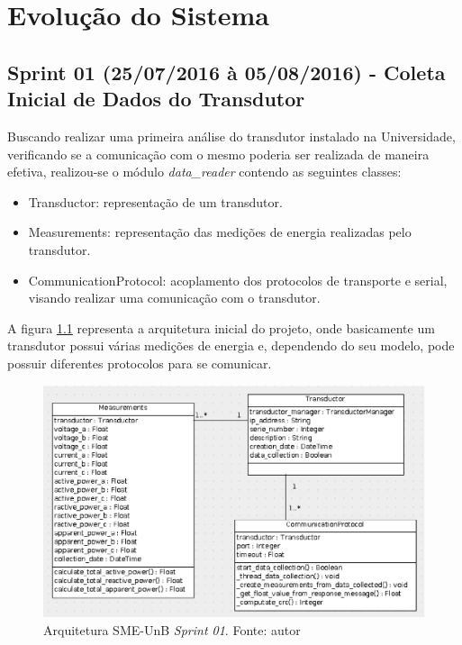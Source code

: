 \chapter{Evolução do Sistema}

\section{Sprint 01 (25/07/2016 à 05/08/2016) - Coleta Inicial de Dados do Transdutor}
Buscando realizar uma primeira análise do transdutor instalado na Universidade, verificando se a comunicação com o mesmo poderia ser realizada de maneira efetiva, realizou-se o módulo \textit{data\_reader} contendo as seguintes classes:
\begin{itemize}
    \item Transductor: representação de um transdutor.
    \item Measurements: representação das medições de energia realizadas pelo transdutor.
    \item CommunicationProtocol: acoplamento dos protocolos de transporte e serial, visando realizar uma comunicação com o transdutor.
\end{itemize}

A figura \ref{sprint01arq} representa a arquitetura inicial do projeto, onde basicamente um transdutor possui várias medições de energia e, dependendo do seu modelo, pode possuir diferentes protocolos para se comunicar.

\begin{figure}[!htpb]
    \centering
    \includegraphics[keepaspectratio=true,scale=0.6]{figuras/sprint01arq.eps}
    \caption{Arquitetura SME-UnB \textit{Sprint 01}. Fonte: autor}
    \label{sprint01arq}
\end{figure}

